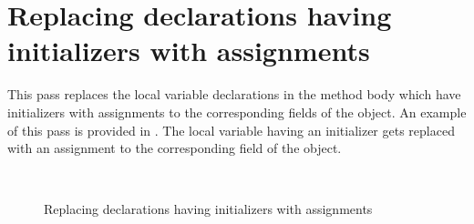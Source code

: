 \section{Replacing declarations having initializers with assignments}

This pass replaces the local variable declarations in the method body which have initializers with assignments to the
corresponding fields of the  object. An example of this pass is provided in
. The local variable  having an initializer gets replaced
with an assignment to the corresponding field of the  object.

\begin{figure}[htb]
    \\
    \caption{Replacing declarations having initializers with assignments \label{img:replace-declaration}}
\end{figure}